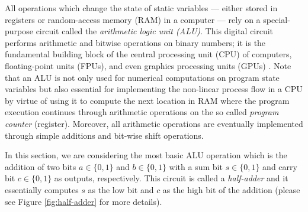\label{sec:noisy-half-adder}
All operations which change the state of static variables --- either stored in registers or random-access memory (RAM) in a computer --- rely on a special-purpose circuit called the {\em arithmetic logic unit (ALU)}. This digital circuit performs arithmetic and bitwise operations on binary numbers; it is the fundamental building block of the central processing unit (CPU) of computers, floating-point units (FPUs), and even graphics processing units (GPUs) \cite{HamVraZak2012i}. Note that an ALU is not only used for numerical computations on program state variables but also essential for implementing the non-linear process flow in a CPU by virtue of using it to compute the next location in RAM where the program execution continues through arithmetic operations on the so called {\em program counter} (register). Moreover, all arithmetic operations are eventually implemented through simple additions and bit-wise shift operations.

In this section, we are considering the most basic ALU operation which is the addition of two bits $a \in \{0,1\}$ and $b \in \{0,1\}$ with a sum bit $s \in \{0,1\}$ and carry bit $c \in \{0,1\}$ as outputs, respectively. This circuit is called a {\em half-adder} and it essentially computes $s$ as the low bit and $c$ as the high bit of the addition (please see Figure \ref{fig:half-adder} for more details).

